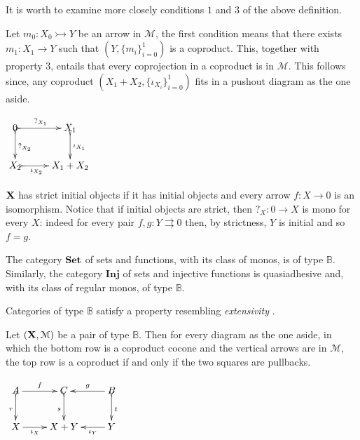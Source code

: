 \documentclass[a4paper,UKenglish,cleveref,pdftex,thm-restate,numberwithinsect,anonymous]{lipics}
\def\X{\textbf {\textup{X}}}
\def\Set{\textbf {\textup{Set}}}
\begin{document}
\begin{remark}
	It is worth to examine more closely conditions $1$ and $3$ of the above definition.
	\smallskip 
	\begin{itemize}
	\parbox{10.3cm}{\item Let $m_0\colon X_0 \rightarrowtail Y$ be an arrow in $\mathcal{M}$, the first condition means that there exists $m_1\colon X_1\to Y$ such that $(Y, \{m_i\}_{i=0}^1)$ is a coproduct. This, together with property $3$, entails that every coprojection in a coproduct is in $\mathcal{M}$. This follows since, any coproduct $(X_1+X_2, \{\iota_{X_i}\}_{i=0}^1)$ fits in a pushout diagram as the one aside.}
	  \parbox{3cm}{\vspace{-0em}$\xymatrix@C=25pt{0  \ar@{>->}[r]^-{?_{X_1}} \ar@{>->}[d]^{?_{X_2}}& X_1 \ar@{>->}[d]^{\iota_{X_1}}\\ X_2 \ar@{>->}[r]_-{\iota_{X_2}} & X_1+X_2}$}
		
	\smallskip 	\noindent 
	\parbox{13.5cm}{\item $\X$ has strict initial objects if it has initial objects and every arrow $f:X\to 0$ is an isomorphism. Notice that if initial objects are strict, then $?_X\colon 0\to X$ is mono for every $X$: indeed for every pair $f,g\colon Y\rightrightarrows 0$ then, by strictness, $Y$ is initial and so $f=g$.}
	\end{itemize} 
\end{remark}

\begin{example}
The category $\Set$ of sets and functions, with its class of monos, is of type $\mathbb{B}$. Similarly, the category $\textbf{Inj}$ of sets and injective functions is quasiadhesive and, with its class of regular monos, of type $\mathbb{B}$. 
\end{example}

Categories of type $\mathbb{B}$ satisfy a property resembling \emph{extensivity} \cite{carboni1993introduction}.

\noindent
\parbox{10cm}{\begin{proposition}\label{prop:ext}
Let $(\X, \mathcal{M})$ be a pair of type $\mathbb{B}$. Then for every diagram as the one aside, in which the bottom row is a coproduct cocone and the vertical arrows are in $\mathcal{M}$, the top row is a coproduct if and only if the two squares are pullbacks.
\end{proposition}}
\parbox{2cm}{\vspace{-.4em}$\xymatrix{A\ar[r]^-{f} \ar@{>->}[d]_{r}& C  \ar@{>->}[d]_{s}& B \ar@{>->}[d]^{t}\ar[l]_-{g}\\X  \ar[r]_-{\iota_X}& X+Y & Y \ar[l]^-{\iota_Y}}$}
\end{document}
